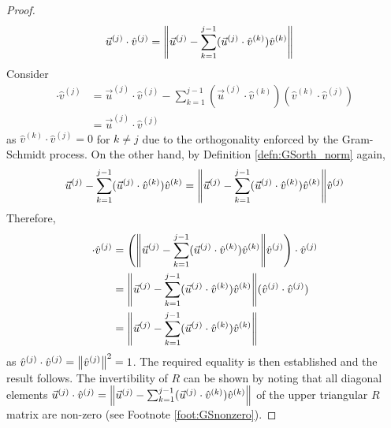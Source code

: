\begin{proof}
\begin{align*}
\vec{u}^{(j)} \cdot \hat{v}^{(j)} &= \norm{\vec{u}^{(j)} - \sum_{k=1}^{j-1}(\vec{u}^{(j)} \cdot \hat{v}^{(k)})\hat{v}^{(k)}}
\end{align*}
Consider
\begin{align*}
[\vec{u}^{(j)} - \sum_{k=1}^{j-1}(\vec{u}^{(j)} \cdot \hat{v}^{(k)})\hat{v}^{(k)}] \cdot \hat{v}^{(j)} &= \vec{u}^{(j)} \cdot \hat{v}^{(j)} - \sum_{k=1}^{j-1}(\vec{u}^{(j)} \cdot \hat{v}^{(k)}) (\hat{v}^{(k)} \cdot \hat{v}^{(j)})\\
&= \vec{u}^{(j)} \cdot \hat{v}^{(j)}
\end{align*}
as $\hat{v}^{(k)} \cdot \hat{v}^{(j)} = 0$ for $k \neq j$ due to the orthogonality enforced by the Gram-Schmidt process. On the other hand, by Definition \ref{defn:GSorth_norm} again, 
\begin{align*}
\vec{u}^{(j)} - \sum_{k=1}^{j-1}(\vec{u}^{(j)} \cdot \hat{v}^{(k)})\hat{v}^{(k)} = \norm{\vec{u}^{(j)} - \sum_{k=1}^{j-1}(\vec{u}^{(j)} \cdot \hat{v}^{(k)})\hat{v}^{(k)}} \hat{v}^{(j)}
\end{align*}
Therefore,
\begin{align*}
[\vec{u}^{(j)} - \sum_{k=1}^{j-1}(\vec{u}^{(j)} \cdot \hat{v}^{(k)})\hat{v}^{(k)}] \cdot \hat{v}^{(j)} &= \left(\norm{\vec{u}^{(j)} - \sum_{k=1}^{j-1}(\vec{u}^{(j)} \cdot \hat{v}^{(k)})\hat{v}^{(k)}} \hat{v}^{(j)}\right) \cdot \hat{v}^{(j)} \\
&= \norm{\vec{u}^{(j)} - \sum_{k=1}^{j-1}(\vec{u}^{(j)} \cdot \hat{v}^{(k)})\hat{v}^{(k)}} (\hat{v}^{(j)} \cdot\hat{v}^{(j)}) \\
&= \norm{\vec{u}^{(j)} - \sum_{k=1}^{j-1}(\vec{u}^{(j)} \cdot \hat{v}^{(k)})\hat{v}^{(k)}}
\end{align*}
as $\hat{v}^{(j)} \cdot \hat{v}^{(j)} = \norm{\hat{v}^{(j)}}^2 = 1$. The required equality is then established and the result follows. The invertibility of $R$ can be shown by noting that all diagonal elements $\vec{u}^{(j)} \cdot \hat{v}^{(j)} = \norm{\vec{u}^{(j)} - \sum_{k=1}^{j-1}(\vec{u}^{(j)} \cdot \hat{v}^{(k)})\hat{v}^{(k)}} $ of the upper triangular $R$ matrix are non-zero (see Footnote \ref{foot:GSnonzero}). 
\end{proof}

